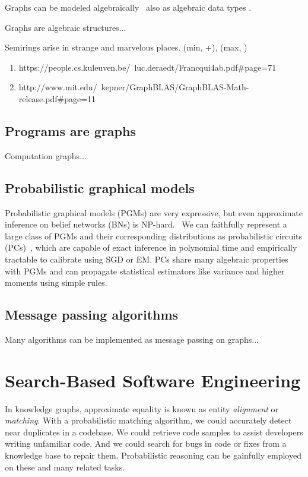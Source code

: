 \documentclass[11pt]{article}
\begin{document}
    Graphs can be modeled algebraically~\citep{weisfeiler1968reduction}  also as algebraic data types \citep{mokhov2017algebraic}.

    Graphs are algebraic structures...

    Semirings arise in strange and marvelous places. (min, +), (max, \times)

    \begin{enumerate}
        \item https://people.cs.kuleuven.be/~luc.deraedt/Francqui4ab.pdf#page=71
        \item http://www.mit.edu/~kepner/GraphBLAS/GraphBLAS-Math-release.pdf#page=11
    \end{enumerate}

    \subsection{Programs are graphs}

    Computation graphs...

    \subsection{Probabilistic graphical models}

    Probabilistic graphical models (PGMs) are very expressive, but even approximate inference on belief networks (BNs) is NP-hard.~\citep{dagum1993approximating} We can faithfully represent a large class of PGMs and their corresponding distributions as probabilistic circuits (PCs)~\citep{choi2020probabilistic}, which are capable of exact inference in polynomial time and empirically tractable to calibrate using SGD or EM. PCs share many algebraic properties with PGMs and can propagate statistical estimators like variance and higher moments using simple rules.


    \subsection{Message passing algorithms}

    Many algorithms can be implemented as message passing on graphs...

    \section{Search-Based Software Engineering}\label{sec:applications}

    In knowledge graphs, approximate equality is known as entity \textit{alignment} or \textit{matching}. With a probabilistic matching algorithm, we could accurately detect near duplicates in a codebase. We could retrieve code samples to assist developers writing unfamiliar code. And we could search for bugs in code or fixes from a knowledge base to repair them. Probabilistic reasoning can be gainfully employed on these and many related tasks.
\end{document}
